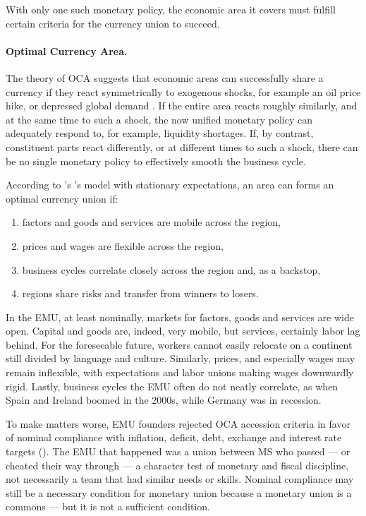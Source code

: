With only one such monetary policy, the economic area it covers must fulfill certain criteria for the currency union to succeed.

\paragraph{Optimal Currency Area.}  \label{sec:OCA} The theory of \gls{OCA} suggests that economic areas can successfully share a currency if they react symmetrically to exogenous shocks, for example an oil price hike, or depressed global demand \citep{Mundell1961}.
If the entire area reacts roughly similarly, and at the same time to such a shock, the now unified monetary policy can adequately respond to, for example, liquidity shortages.
If, by contrast, constituent parts react differently, or at different times to such a shock, there can be no single monetary policy to effectively smooth the business cycle.

According to \citeauthor{Mundell1961}'s \citeyearpar{Mundell1961}'s  model with stationary expectations, an area can forms an optimal currency union if:
\begin{enumerate}
	\item factors and goods and services are mobile across the region,
	\item prices and wages are flexible across the region,
	\item business cycles correlate closely across the region and, as a backstop,
	\item regions share risks and transfer from winners to losers.
\end{enumerate}

In the \gls{EMU}, at least nominally, markets for factors, goods and services are wide open.
Capital and goods are, indeed, very mobile, but services, certainly labor lag behind.
For the foreseeable future, workers cannot easily relocate on a continent still divided by language and culture.
Similarly, prices, and especially wages may remain inflexible, with expectations and labor unions making wages downwardly rigid.
Lastly, business cycles the \gls{EMU} often do not neatly correlate, as when Spain and Ireland boomed in the 2000s, while Germany was in recession.

To make matters worse, \gls{EMU} founders rejected \gls{OCA} accession criteria in favor of nominal compliance with inflation, deficit, debt, exchange and interest rate targets (\citealt[4]{Begg2008}).
The \gls{EMU} that happened was a union between \gls{MS} who passed --- or cheated their way through --- a character test of monetary and fiscal discipline, not necessarily a team that had similar needs or skills.
Nominal compliance may still be a necessary condition for monetary union because a monetary union is a commons --- but it is not a sufficient condition.

